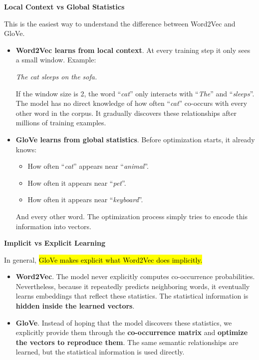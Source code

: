 \highspace
\begin{flushleft}
    \textcolor{DarkOrange3}{ \textbf{Local Context vs Global Statistics}}
\end{flushleft}
This is the easiest way to understand the difference between Word2Vec and GloVe.
\begin{itemize}
    \item \textbf{Word2Vec learns from local context}. At every training step it only sees a small window. Example:
    \begin{center}
        \emph{The cat sleeps on the sofa.}
    \end{center}
    If the window size is 2, the word ``\emph{cat}'' only interacts with ``\emph{The}'' and ``\emph{sleeps}''. The model has no direct knowledge of how often ``\emph{cat}'' co-occurs with every other word in the corpus. It gradually discovers these relationships after millions of training examples.

    \item \textbf{GloVe learns from global statistics}. Before optimization starts, it already knows:
    \begin{itemize}
        \item How often ``\emph{cat}'' appears near ``\emph{animal}''.
        \item How often it appears near ``\emph{pet}''.
        \item How often it appears near ``\emph{keyboard}''.
    \end{itemize}
    And every other word. The optimization process simply tries to encode this information into vectors.
\end{itemize}

\highspace
\begin{flushleft}
    \textcolor{DarkOrange3}{ \textbf{Implicit vs Explicit Learning}}
\end{flushleft}
In general, \hl{GloVe makes explicit what Word2Vec does implicitly.}
\begin{itemize}
    \item \textbf{Word2Vec}. The model never explicitly computes co-occurrence probabilities. Nevertheless, because it repeatedly predicts neighboring words, it eventually learns embeddings that reflect these statistics. The statistical information is \textbf{hidden inside the learned vectors}.

    \item \textbf{GloVe}. Instead of hoping that the model discovers these statistics, we explicitly provide them through the \textbf{co-occurrence matrix} and \textbf{optimize the vectors to reproduce them}. The same semantic relationships are learned, but the statistical information is used directly.
\end{itemize}

